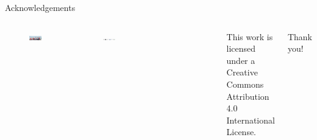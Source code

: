 \documentclass[10pt,aspectratio=169]{beamer}
\begin{document}
\begin{frame}{Acknowledgements}
    \begin{columns}[c]
        \begin{figure}
            \centering
            \includegraphics[width=1\textwidth]{figures/acknowledgements_groupfoto.jpeg}
        \end{figure}
        \begin{figure}
            \centering
            \includegraphics[width=1\textwidth]{figures/acknowledgements_logos.jpeg}
        \end{figure}
        \par\noindent\rule{\textwidth}{0.4pt}
        \newline
        \begin{columns}[c]
            \begin{figure}[c]
                \centering
                \includegraphics[width=1\textwidth]{figures/by.pdf}
            \end{figure}
            This work is licensed under a Creative Commons Attribution 4.0 International License.
        \end{columns}
        \huge{\centerline{Thank you!}}
    \end{columns}
\end{frame}
\end{document}
